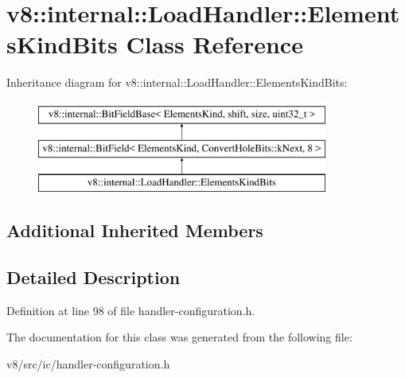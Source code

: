 \hypertarget{classv8_1_1internal_1_1LoadHandler_1_1ElementsKindBits}{}\section{v8\+:\+:internal\+:\+:Load\+Handler\+:\+:Elements\+Kind\+Bits Class Reference}
\label{classv8_1_1internal_1_1LoadHandler_1_1ElementsKindBits}
Inheritance diagram for v8\+:\+:internal\+:\+:Load\+Handler\+:\+:Elements\+Kind\+Bits\+:\begin{figure}[H]
\begin{center}
\leavevmode
\includegraphics[height=3.000000cm]{classv8_1_1internal_1_1LoadHandler_1_1ElementsKindBits}
\end{center}
\end{figure}
\subsection*{Additional Inherited Members}


\subsection{Detailed Description}


Definition at line 98 of file handler-\/configuration.\+h.



The documentation for this class was generated from the following file\+:\begin{DoxyCompactItemize}
\item 
v8/src/ic/handler-\/configuration.\+h\end{DoxyCompactItemize}

